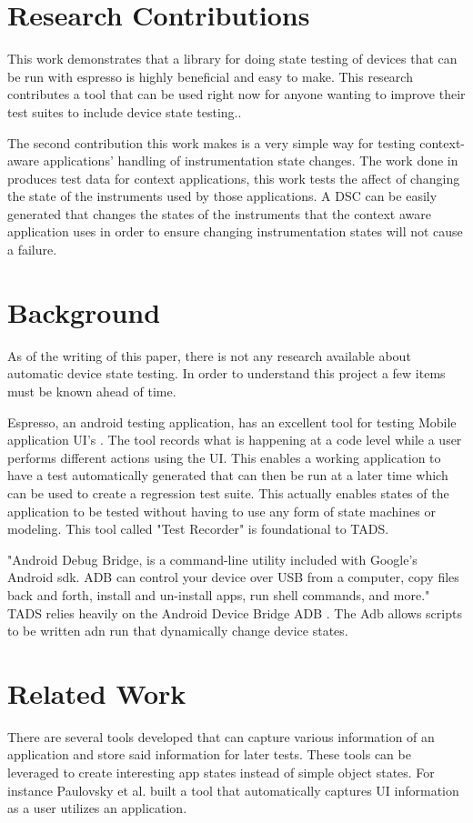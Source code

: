 \section{Research Contributions}
This work demonstrates that a library for doing state testing of devices that can be run with espresso is highly beneficial and easy to make.  This research contributes a tool that can be used right now for anyone wanting to improve their test suites to include device state testing.. 

The second contribution this work makes is a very simple way for testing context-aware applications' handling of instrumentation state changes. The work done in \cite{Luo:2017:TLT:3139486.3130945} produces test data for context applications, this work tests the affect of changing the state of the instruments used by those applications.  A DSC can be easily generated that changes the states of the instruments that the context aware application uses in order to ensure changing instrumentation states will not cause a failure. 

\section{Background}
As of the writing of this paper, there is not any research available about automatic device state testing.  In order to understand this project a few items must be known ahead of time.  

Espresso, an android testing application, has an excellent tool for testing Mobile application UI's \cite{nolan2015agile}.  The tool records what is happening at a code level while a user performs different actions using the UI.  This enables a working application to have a test automatically generated that can then be run at a later time which can be used to create a regression test suite.  This actually enables states of the application to be tested without having to use any form of state machines or modeling.  This tool called "Test Recorder" is foundational to TADS. 

"Android Debug Bridge, is a command-line utility included with Google's Android sdk. ADB can control your device over USB from a computer, copy files back and forth, install and un-install apps, run shell commands, and more." \cite{hoffman2017}  TADS relies heavily on the Android Device Bridge  ADB . The Adb allows scripts to be written adn run that dynamically change device states.


\section{Related Work}
There are several tools developed that can capture various information of an application and store said information for later tests.  These tools can be leveraged to create interesting app states instead of simple object states.  For instance Paulovsky et al. \cite{7962332} built a tool that automatically captures UI information as a user utilizes an application. 

